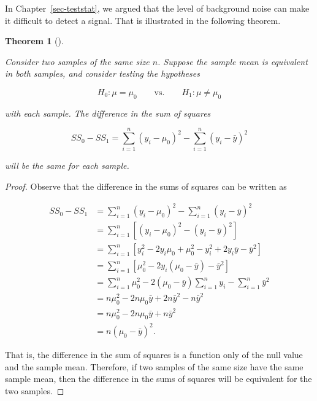\documentclass[
  letterpaper,
  DIV=11,
  numbers=noendperiod]{scrreprt}
\theoremstyle{plain}
\newtheorem{theorem}{Theorem}[chapter]
\theoremstyle{definition}
\theoremstyle{definition}
\theoremstyle{remark}
\begin{document}
In Chapter~\ref{sec-teststat}, we argued that the level of background
noise can make it difficult to detect a signal. That is illustrated in
the following theorem.

\begin{theorem}[]\protect\hypertarget{thm-app-teststat-same-signal}{}\label{thm-app-teststat-same-signal}

Consider two samples of the same size \(n\). Suppose the sample mean is
equivalent in both samples, and consider testing the hypotheses

\[H_0: \mu = \mu_0 \qquad \text{vs.} \qquad H_1: \mu \neq \mu_0\]

with each sample. The difference in the sum of squares

\[SS_0 - SS_1 = \sum_{i=1}^{n} \left(y_i - \mu_0\right)^2 - \sum_{i=1}^{n} \left(y_i - \bar{y}\right)^2\]

will be the same for each sample.

\end{theorem}

\begin{proof}
Observe that the difference in the sums of squares can be written as

\[
\begin{aligned}
  SS_0 - SS_1 
    &= \sum_{i=1}^{n} \left(y_i - \mu_0\right)^2 - \sum_{i=1}^{n} \left(y_i - \bar{y}\right)^2 \\
    &= \sum_{i=1}^{n} \left[\left(y_i - \mu_0\right)^2 - \left(y_i - \bar{y}\right)^2\right] \\
    &= \sum_{i=1}^{n} \left[y_i^2 - 2y_i \mu_0 + \mu_0^2 - y_i^2 + 2y_i \bar{y} - \bar{y}^2\right] \\
    &= \sum_{i=1}^{n} \left[\mu_0^2 - 2y_i \left(\mu_0 - \bar{y}\right) - \bar{y}^2\right] \\
    &= \sum_{i=1}^{n} \mu_0^2 - 2\left(\mu_0 - \bar{y}\right)\sum_{i=1}^{n} y_i - \sum_{i=1}^{n} \bar{y}^2 \\
    &= n\mu_0^2 - 2n\mu_0 \bar{y} + 2n\bar{y}^2 - n\bar{y}^2 \\
    &= n\mu_0^2 - 2n\mu_0 \bar{y} + n\bar{y}^2 \\
    &= n \left(\mu_0 - \bar{y}\right)^2.
\end{aligned}
\]

That is, the difference in the sum of squares is a function only of the
null value and the sample mean. Therefore, if two samples of the same
size have the same sample mean, then the difference in the sums of
squares will be equivalent for the two samples.
\end{proof}
\end{document}

